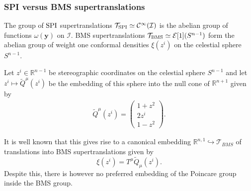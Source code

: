 \documentclass[a4paper, 10pt]{article}
\theoremstyle{remark}
\newcommand{\y}{\bm{y}}
\newcommand{\SPI}{\textnormal{SPI}}%
\newcommand{\BMS}{\textnormal{BMS}}
\begin{document}
 

\subsubsection{SPI versus BMS supertranslations}

The group of $\SPI$ supertranslations $\mathcal{T}_{\SPI} \simeq \mathcal{C}^{\infty}(\mathcal{I})$ is the abelian group of functions $\omega(\y)$ on $\mathcal{I}$. BMS supertranslations $\mathcal{T}_{\BMS} \simeq \mathcal{E}[1](S^{n-1})$ form the abelian group of weight one conformal densities $\xi(z^i)$ on the celestial sphere $S^{n-1}$.

Let $z^i \in \mathbb{R}^{n-1}$ be stereographic coordinates on the celestial sphere $S^{n-1}$ and let $z^i \mapsto \tilde{Q}^{\mu}\left(z^i\right)$ be the embedding of this sphere into the null cone of $\mathbb{R}^{n+1}$ given by
\begin{align}
    \tilde{Q}^{\mu}\left(z^i\right) = \begin{pmatrix}
        1+ z^2 \\ 2 z^i \\ 1-z^2
    \end{pmatrix}.
\end{align}

It is well known that this gives rise to a canonical embedding $\mathbb{R}^{n,1}  \hookrightarrow \mathcal{T}_{BMS}$ of translations into BMS supertranslations given by
\begin{equation*}
   \xi(z^i) = T^{\mu} \tilde{Q}_{\mu}\left(z^i\right).
\end{equation*}
Despite this, there is however no preferred embedding of the Poincare group inside the BMS group.
\end{document}
